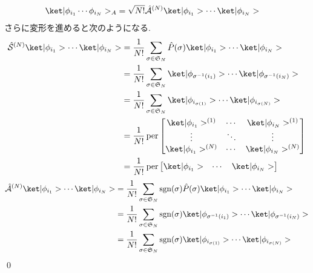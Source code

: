 \documentclass[uplatex,dvipdfmx,a4paper,11pt]{jlreq}
\makeatletter
\DeclareMathOperator{\sgn}{sgn}
\DeclareMathOperator{\per}{per}
\renewcommand{\SS}{\mathfrak{S}}
\renewcommand{\S}{\mathcal{S}}
\newcommand{\A}{\mathcal{A}}
\numberwithin{equation}{section}
\theoremstyle{definition}
\renewenvironment{proof}[1][\proofname]{\par
  \normalfont
  \topsep6\p@\@plus6\p@ \trivlist
  \item[\hskip\labelsep{\bfseries #1}\@addpunct{\bfseries}]\ignorespaces\quad\par
}{%
  \qed\endtrivlist\@endpefalse
}
\renewcommand\proofname{証明}
\makeatother
\begin{document}
\begin{proof}
\begin{align}
    \ket|\phi_{i_1}\cdots\phi_{i_N}>_A & = \sqrt{N!}\hat{\A}^{(N)}\ket|\phi_{i_1}>\cdots\ket|\phi_{i_N}>
  \end{align}
  さらに変形を進めると次のようになる.
  \begin{align}
    \hat{\S}^{(N)}\ket|\phi_{i_1}>\cdots\ket|\phi_{i_N}> & = \frac{1}{N!}\sum_{\sigma\in\SS_N}\hat{P}(\sigma)\ket|\phi_{i_1}>\cdots\ket|\phi_{i_N}>            \\
                                                         & = \frac{1}{N!}\sum_{\sigma\in\SS_N}\ket|\phi_{\sigma^{-1}(i_1)}>\cdots\ket|\phi_{\sigma^{-1}(i_N)}> \\
                                                         & = \frac{1}{N!}\sum_{\sigma\in\SS_N}\ket|\phi_{i_{\sigma(1)}}>\cdots\ket|\phi_{i_{\sigma(N)}}>       \\
                                                         & = \frac{1}{N!}\per\begin{bmatrix}
                                                                               \ket|\phi_{i_1}>^{(1)} & \cdots & \ket|\phi_{i_N}>^{(1)} \\
                                                                               \vdots                 & \ddots & \vdots                 \\
                                                                               \ket|\phi_{i_1}>^{(N)} & \cdots & \ket|\phi_{i_N}>^{(N)}
                                                                             \end{bmatrix}                          \\
                                                         & = \frac{1}{N!}\per\begin{bmatrix}\ket|\phi_{i_1}> & \cdots & \ket|\phi_{i_N}>\end{bmatrix}
  \end{align}
  \begin{align}
    \hat{\A}^{(N)}\ket|\phi_{i_1}>\cdots\ket|\phi_{i_N}> & = \frac{1}{N!}\sum_{\sigma\in\SS_N}\sgn(\sigma)\hat{P}(\sigma)\ket|\phi_{i_1}>\cdots\ket|\phi_{i_N}>            \\
                                                         & = \frac{1}{N!}\sum_{\sigma\in\SS_N}\sgn(\sigma)\ket|\phi_{\sigma^{-1}(i_1)}>\cdots\ket|\phi_{\sigma^{-1}(i_N)}> \\
                                                         & = \frac{1}{N!}\sum_{\sigma\in\SS_N}\sgn(\sigma)\ket|\phi_{i_{\sigma(1)}}>\cdots\ket|\phi_{i_{\sigma(N)}}>       \\

\end{align}
\end{proof}
\end{document}
